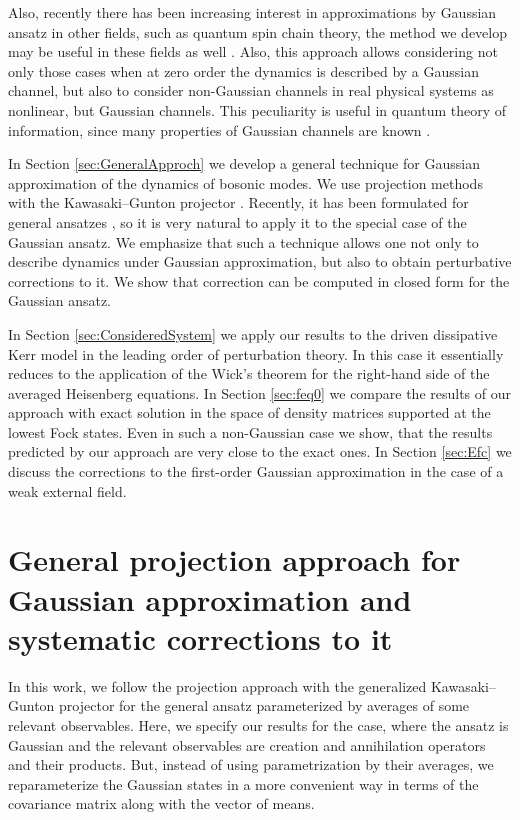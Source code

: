 \documentclass[12pt]{article}
\theoremstyle{definition}
\begin{document}
 Also, recently there has been increasing interest in approximations by Gaussian ansatz in other fields, such as quantum spin chain theory, the method we develop may be useful in these fields as well \cite{GaussState}. Also, this approach allows considering not only those cases when at zero order the dynamics is described by a Gaussian channel, but also to consider non-Gaussian channels in real physical systems as nonlinear, but Gaussian channels. This peculiarity is useful in quantum theory of information, since many properties of Gaussian channels are known \cite{Kholevo}.
	
	In Section \ref{sec:GeneralApproch} we develop a general technique for  Gaussian approximation of the dynamics of bosonic modes. We use projection methods with the Kawasaki–Gunton projector \cite{kawasaki1973theory, rau1996reversible, semin2020dynamical}. Recently, it has been formulated for general ansatzes \cite{meretukov2024time}, so it is very natural to apply it to the special case of the Gaussian ansatz. We emphasize that such  a technique allows one not only to describe dynamics under Gaussian approximation, but also to obtain  perturbative corrections to it. We show that correction can be computed in closed form for the Gaussian ansatz.
 
 In Section \ref{sec:ConsideredSystem} we apply our results to the driven dissipative Kerr model \cite{asjad2023joint} in the leading order of perturbation theory. In this case it essentially reduces to the application of the Wick's theorem for the right-hand side of the averaged Heisenberg equations. In Section \ref{sec:feq0} we compare the results of our approach with exact solution in the space of density matrices supported at the lowest Fock states. Even in such a non-Gaussian case we show, that the results predicted by our approach are very close to the exact ones. In Section \ref{sec:Efc} we discuss the corrections to the first-order Gaussian approximation in the case of a weak external field.
	
	
	\section{\label{sec:GeneralApproch}General projection approach for Gaussian approximation and systematic corrections to it}
	
	In this work, we follow the projection approach with the generalized Kawasaki–Gunton projector  \cite{meretukov2024time} for the general ansatz parameterized by averages of some relevant observables. Here, we specify our results for the case, where the ansatz is Gaussian and the relevant observables are creation and annihilation operators and their products.  But,  instead of using parametrization by their averages, we reparameterize  the Gaussian states in a more convenient way in terms of the covariance matrix along with the vector of means.
	
\end{document}
